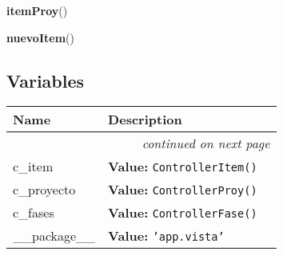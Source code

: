     \label{app:vista:vistaItem:itemProy}

    \vspace{0.5ex}

\hspace{.8\funcindent}\begin{boxedminipage}{\funcwidth}

    \raggedright \textbf{itemProy}()

\setlength{\parskip}{2ex}
\setlength{\parskip}{1ex}
    \end{boxedminipage}

    \label{app:vista:vistaItem:nuevoItem}

    \vspace{0.5ex}

\hspace{.8\funcindent}\begin{boxedminipage}{\funcwidth}

    \raggedright \textbf{nuevoItem}()

\setlength{\parskip}{2ex}
\setlength{\parskip}{1ex}
    \end{boxedminipage}



  \subsection{Variables}

    \vspace{-1cm}
\hspace{\varindent}\begin{longtable}{|p{\varnamewidth}|p{\vardescrwidth}|l}
\cline{1-2}
\cline{1-2} \centering \textbf{Name} & \centering \textbf{Description}& \\
\cline{1-2}
\endhead\cline{1-2}\multicolumn{3}{r}{\small\textit{continued on next page}}\\\endfoot\cline{1-2}
\endlastfoot\raggedright c\-\_\-i\-t\-e\-m\- & \raggedright \textbf{Value:} 
{\tt ControllerItem()}&\\
\cline{1-2}
\raggedright c\-\_\-p\-r\-o\-y\-e\-c\-t\-o\- & \raggedright \textbf{Value:} 
{\tt ControllerProy()}&\\
\cline{1-2}
\raggedright c\-\_\-f\-a\-s\-e\-s\- & \raggedright \textbf{Value:} 
{\tt ControllerFase()}&\\
\cline{1-2}
\raggedright \_\-\_\-p\-a\-c\-k\-a\-g\-e\-\_\-\_\- & \raggedright \textbf{Value:} 
{\tt \texttt{'}\texttt{app.vista}\texttt{'}}&\\
\cline{1-2}
\end{longtable}

